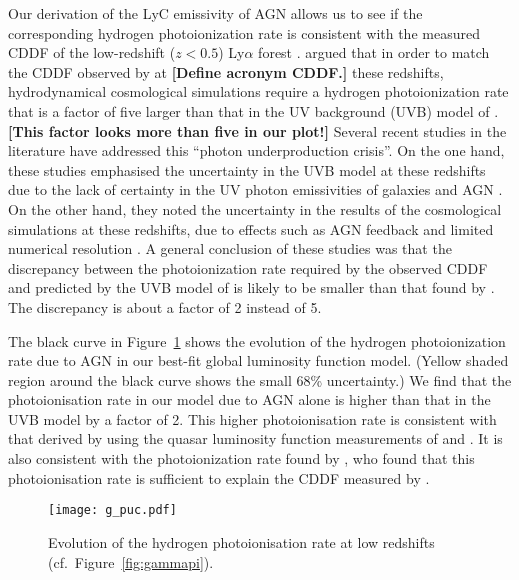 \documentclass[a4paper,fleqn,usenatbib]{mnras}
\newcommand{\gk}[1]{{\bf \color{notecolor} [#1]}}
\begin{document}
Our derivation of the LyC emissivity of AGN allows us to see if the
corresponding hydrogen photoionization rate is consistent with the
measured CDDF of the low-redshift ($z<0.5$) Ly$\alpha$ forest
\citep{2016ApJ...817..111D}.  \citet{2014ApJ...789L..32K} argued that
in order to match the CDDF observed by \citet{2016ApJ...817..111D} at
\gk{Define acronym CDDF.}  these redshifts, hydrodynamical
cosmological simulations require a hydrogen photoionization rate that
is a factor of five larger than that in the UV background (UVB) model
of \citet{2012ApJ...746..125H}.  \gk{This factor looks more than five
  in our plot!}  Several recent studies in the literature have
addressed this ``photon underproduction crisis''.  On the one hand,
these studies emphasised the uncertainty in the
\citet{2012ApJ...746..125H} UVB model at these redshifts due to the
lack of certainty in the UV photon emissivities of galaxies and AGN
\citep{2015MNRAS.451L..30K, 2015ApJ...811....3S}.  On the other hand,
they noted the uncertainty in the results of the cosmological
simulations at these redshifts, due to effects such as AGN feedback
and limited numerical resolution \citep{2015ApJ...811....3S,
  2017MNRAS.467L..86V, 2017MNRAS.471.1056N, 2017ApJ...837..106O,
  2017MNRAS.466..838G, 2017MNRAS.467.3172G, 2017ApJ...835..175G}.  A
general conclusion of these studies was that the discrepancy between
the photoionization rate required by the observed CDDF and predicted
by the UVB model of \citet{2012ApJ...746..125H} is likely to be
smaller than that found by \citet{2014ApJ...789L..32K}.  The
discrepancy is about a factor of 2 instead of 5.

The black curve in Figure~\ref{fig:puc} shows the evolution of the
hydrogen photoionization rate due to AGN in our best-fit global
luminosity function model.  (Yellow shaded region around the black
curve shows the small 68\% uncertainty.)  We find that the
photoionisation rate in our model due to AGN alone is higher than that
in the \citet{2012ApJ...746..125H} UVB model by a factor of 2.  This
higher photoionisation rate is consistent with that derived by
\citet{2015MNRAS.451L..30K} using the quasar luminosity function
measurements of \citet{2009MNRAS.392...19C} and
\citet{2013A&A...551A..29P}.  It is also consistent with the
photoionization rate found by \citet{2017MNRAS.467.3172G}, who found
that this photoionisation rate is sufficient to explain the CDDF
measured by \citet{2016ApJ...817..111D}.

\begin{figure}
  \begin{center}
    \texttt{[image: g\_puc.pdf]}
  \end{center}
  \caption{Evolution of the hydrogen photoionisation rate at low
    redshifts (cf.\ Figure~\ref{fig:gammapi}).\label{fig:puc}}
\end{figure}
\end{document}

